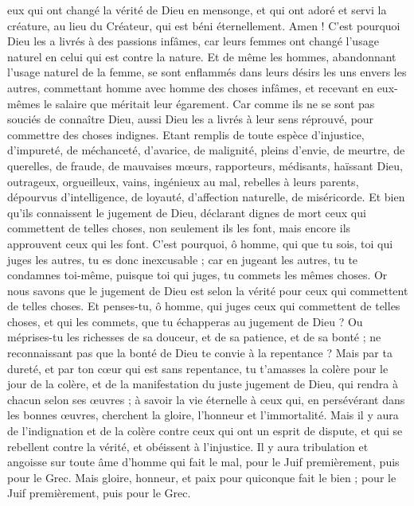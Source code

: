 \begin{multicols}{2}
eux qui ont changé la vérité de Dieu en mensonge, et qui ont adoré et servi la créature, au lieu du Créateur, qui est béni éternellement. Amen !
C'est pourquoi Dieu les a livrés à des passions infâmes, car leurs femmes ont changé l'usage naturel en celui qui est contre la nature.
Et de même les hommes, abandonnant l'usage naturel de la femme, se sont enflammés dans leurs désirs les uns envers les autres, commettant homme avec homme des choses infâmes, et recevant en eux-mêmes le salaire que méritait leur égarement.
Car comme ils ne se sont pas souciés de connaître Dieu, aussi Dieu les a livrés à leur sens réprouvé, pour commettre des choses indignes.
Etant remplis de toute espèce d’injustice, d'impureté, de méchanceté, d'avarice, de malignité, pleins d'envie, de meurtre, de querelles, de fraude, de mauvaises mœurs,
rapporteurs, médisants, haïssant Dieu, outrageux, orgueilleux, vains, ingénieux au mal, rebelles à leurs parents,
dépourvus d’intelligence, de loyauté, d’affection naturelle, de miséricorde.
Et bien qu'ils connaissent le jugement de Dieu, déclarant dignes de mort ceux qui commettent de telles choses, non seulement ils les font, mais encore ils approuvent ceux qui les font.
\VerseOne{}C'est pourquoi, ô homme, qui que tu sois, toi qui juges les autres, tu es donc inexcusable ; car en jugeant les autres, tu te condamnes toi-même, puisque toi qui juges, tu commets les mêmes choses.
Or nous savons que le jugement de Dieu est selon la vérité pour ceux qui commettent de telles choses.
Et penses-tu, ô homme, qui juges ceux qui commettent de telles choses, et qui les commets, que tu échapperas au jugement de Dieu ?
Ou méprises-tu les richesses de sa douceur, et de sa patience, et de sa bonté ; ne reconnaissant pas que la bonté de Dieu te convie à la repentance ?
Mais par ta dureté, et par ton cœur qui est sans repentance, tu t'amasses la colère pour le jour de la colère, et de la manifestation du juste jugement de Dieu,
qui rendra à chacun selon ses œuvres ;
à savoir la vie éternelle à ceux qui, en persévérant dans les bonnes œuvres, cherchent la gloire, l'honneur et l'immortalité.
Mais il y aura de l'indignation et de la colère contre ceux qui ont un esprit de dispute, et qui se rebellent contre la vérité, et obéissent à l'injustice.
Il y aura tribulation et angoisse sur toute âme d'homme qui fait le mal, pour le Juif premièrement, puis pour le Grec.
Mais gloire, honneur, et paix pour quiconque fait le bien ; pour le Juif premièrement, puis pour le Grec.

\end{multicols}
